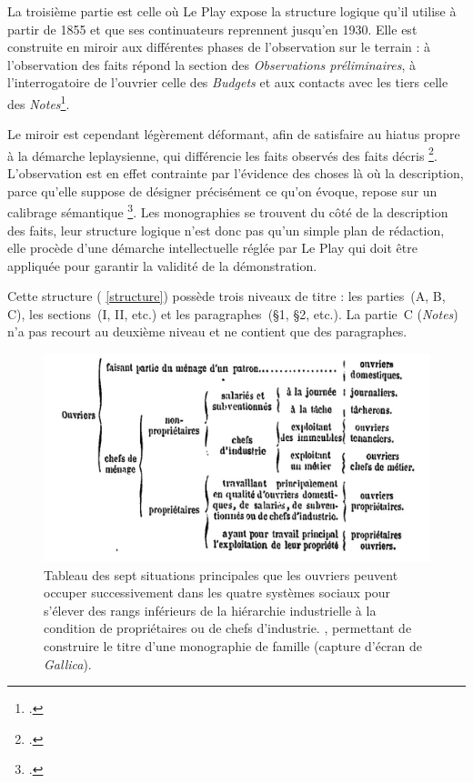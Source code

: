 La troisième partie est celle où Le Play expose la structure logique qu'il utilise à partir de 1855 et que ses continuateurs reprennent jusqu'en 1930.
Elle est construite en miroir aux différentes phases de l'observation sur le terrain : à l'observation des faits répond la section des\textit{ Observations préliminaires}, à l'interrogatoire de l'ouvrier celle des \textit{Budgets} et aux contacts avec les tiers celle des \textit{Notes}\footcite[III., \og Précis des faits à observer --- Établissement des budgets \fg{}, p. 20-31]{instruction62}.

Le miroir est cependant légèrement déformant, afin de satisfaire au \og hiatus \fg{} propre à la démarche leplaysienne, qui différencie les \og faits observés \fg{} des \og faits décris \fg\footcite[p. 87]{baciocchi2}. L'observation est en effet \og contrainte par l'évidence des choses \fg{} là où la description, \og parce qu'elle suppose de désigner précisément ce qu'on évoque, repose sur un calibrage sémantique \fg{}\footcite[p. 87-88]{baciocchi2}. Les monographies se trouvent du côté de la description des faits, leur structure logique n'est donc pas qu'un simple plan de rédaction, elle procède d'une démarche intellectuelle réglée par Le Play qui doit être appliquée pour garantir la validité de la démonstration.

Cette structure (\ann{} \ref{structure}) possède trois niveaux de titre : les parties~(A, B, C), les sections~(I, II, etc.) et les paragraphes~(§1, §2, etc.). La partie~C (\textit{Notes}) n'a pas recourt au deuxième niveau et ne contient que des paragraphes.

\begin{figure}[h]
    \centering
    \includegraphics{img/tabl_titres.jpg}
    \caption{\og Tableau des sept situations principales que les ouvriers peuvent occuper successivement dans les quatre systèmes sociaux pour s'élever des rangs inférieurs de la hiérarchie industrielle à la condition de propriétaires ou de chefs d'industrie. \fg{}, permettant de construire le titre d'une monographie de famille (capture d'écran de \textit{Gallica}).}
    \label{tabletitre}
\end{figure}

